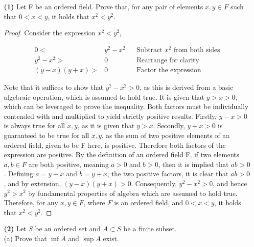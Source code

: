 \documentclass[12pt]{article}
\begin{document}
\pagestyle{fancy}
\setlength{\headheight}{14.49998pt}
\fancyfoot[C]{\thepage}

\noindent \textbf{(1)} Let F be an ordered field. Prove that, for any pair of elements $x,y \in F$ such that $0 < x < y$, it holds that $x^2 < y^2$.

\begin{proof}
Consider the expression $x^2< y^2$,

\begin{align*}
	 0 <& y^2 - x^2 && \text{Subtract } x^2 \text{ from both sides} \\
	 y^2-x^2 >& 0 && \text{Rearrange for clarity} \\
	 (y-x)(y+x) >& 0 && \text{Factor the expression}
\end{align*}

Note that it suffices to show that $y^2-x^2>0$, as this is derived from a basic algebraic operation, which is assumed to hold true. It is given that $y>x>0$, which can be leveraged to prove the inequality. Both factors must be individually contended with and multiplied to yield strictly positive results. Firstly, $y-x>0$ is always true for all $x,y$, as it is given that $y>x$. Secondly, $y+x>0$ is guaranteed to be true for all $x,y$, as the sum of two positive elements of an ordered field, given to be F here, is positive. Therefore both factors of the expression are positive. By the definition of an ordered field F, if two elements $a,b\in F$ are both positive, meaning $a >0$ and $b>0$, then it is implied that $ab>0$. Defining $a=y-x$ and $b=y+x$, the two positive factors, it is clear that $ab>0$, and by extension, $(y-x)(y+x) > 0$. Consequently, $y^2 - x^2 >0$, and hence $y^2 > x^2$ by fundamental properties of algebra which are assumed to hold true. Therefore, for any $x,y\in F$, where $F$ is an ordered field, and $0<x<y$, it holds that $x^2 < y^2$.
\end{proof}

\newpage
 
\noindent \textbf{(2)} Let $S$ be an ordered set and $A \subset S$ be a finite subset. \\
\indent(a) Prove that $\inf A$ and $\sup A$ exist.
\end{document}
